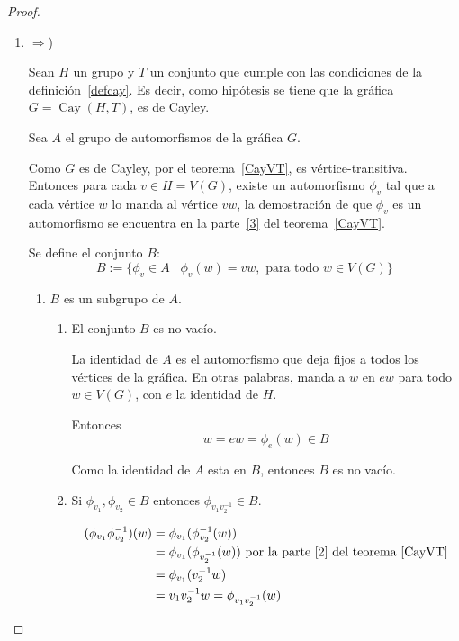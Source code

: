 \documentclass[12pt]{book}
\theoremstyle{definition}
\DeclareMathOperator{\Cay}{Cay}
\begin{document}
\begin{proof}
\begin{enumerate}

\item$\Rightarrow$) 

Sean $H$ un grupo y $T$ un conjunto que cumple con las
condiciones de la definición~\ref{defcay}. Es decir, como hipótesis se
tiene que la gráfica $G=\Cay(H,T)$, es de Cayley. 

Sea $A$ el grupo de automorfismos de la gráfica $G$.


Como $G$ es de Cayley, por el teorema~\ref{CayVT}, es
vértice-transitiva. Entonces para cada $v \in H=V(G)$, existe un
automorfismo $\phi_v$ tal que a cada vértice $w$
lo manda al vértice $vw$, la demostración de que $\phi_v$ es un
automorfismo se encuentra en  la parte~\ref{3} del
teorema~\ref{CayVT}.

 Se define el conjunto $B$:
\begin{equation*}
B:=\{
\phi_{v} \in A \mid \phi_{v} (w)=vw,\text{ para todo }  w\in V(G)\}\end{equation*}
\begin{enumerate}

\item $B$ es un subgrupo de $A$.

\begin{enumerate}

\item El conjunto $B$ es no vacío. 

La identidad de $A$ es el automorfismo que deja fijos a todos los
vértices de la gráfica. En otras palabras, manda a
$w$ en $ew$ para todo $w\in V(G)$, con $e$ la identidad de $H$.

Entonces 
\begin{equation*}
w=ew=\phi_e(w) \in B
\end{equation*}

Como la identidad de $A$ esta en $B$, entonces $B$ es no vacío.

\item
Si $\phi_{v_1}, \phi_{v_2} \in B$ entonces $\phi_{v_1v_2^{-1}} \in B$.

\begin{equation*}
  \begin{split}
    (\phi_{v_1}\phi_{v_2}^{-1})(w)&=\phi_{v_1}(\phi_{v_2}^{-1}(w))\\
    &=\phi_{v_1}(\phi_{v_2^{-1}}(w)) \text{ por la parte~\ref{2} del
    teorema~\ref{CayVT}}\\
    &=\phi_{v_1}(v_2^{-1}w)\\
    &=v_1v_2^{-1}w=\phi_{v_1v_2^{-1}}(w)
  \end{split}
\end{equation*}


\end{enumerate}
\end{enumerate}
\end{enumerate}
\end{proof}
\end{document}
